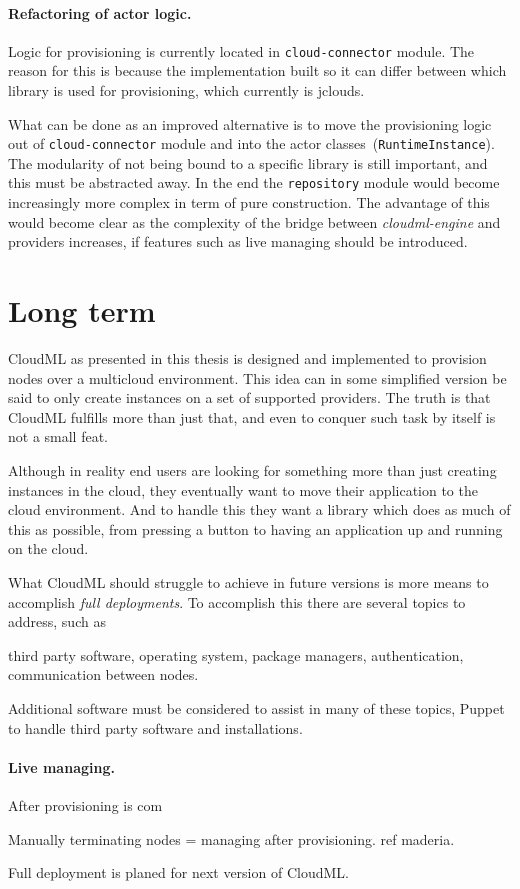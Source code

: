 \paragraph{Refactoring of actor logic.}

Logic for provisioning is currently located in \texttt{cloud-connector} module.
The reason for this is because the implementation built so it can differ between which library is used for provisioning, 
which currently is jclouds.

What can be done as an improved alternative is to move the provisioning logic out of \texttt{cloud-connector} 
module and into the actor classes~(\texttt{RuntimeInstance}).
The modularity of not being bound to a specific library is still important, and this must be abstracted away.
In the end the \texttt{repository} module would become increasingly more complex in term of pure construction.
The advantage of this would become clear as the complexity of the bridge between \emph{cloudml-engine}
and providers increases, \eg if features such as live managing should be introduced.

\section{Long term}


CloudML as presented in this thesis is designed and implemented to provision nodes over a multicloud environment.
This idea can in some simplified version be said to only create instances on a set of supported providers.
The truth is that CloudML fulfills more than just that, and even to conquer such task by itself is not a small feat.

Although in reality end users are looking for something more than just creating instances in the cloud,
they eventually want to move their application to the cloud environment.
And to handle this they want a library which does as much of this as possible,
from pressing a button to having an application up and running on the cloud.

What CloudML should struggle to achieve in future versions is more means to accomplish \emph{full deployments}.
To accomplish this there are several topics to address, such as
\begin{ii}
  \iitem third party software,
  \ittem operating system,
  \ittem package managers,
  \iitem authentication,
  \iitem communication between nodes.
\end{ii}
Additional software must be considered to assist in many of these topics, \eg Puppet to handle third party software and installations.

\paragraph{Live managing.}

After provisioning is com

Manually terminating nodes = managing after provisioning.
ref maderia.

Full deployment is planed for next version of CloudML.


